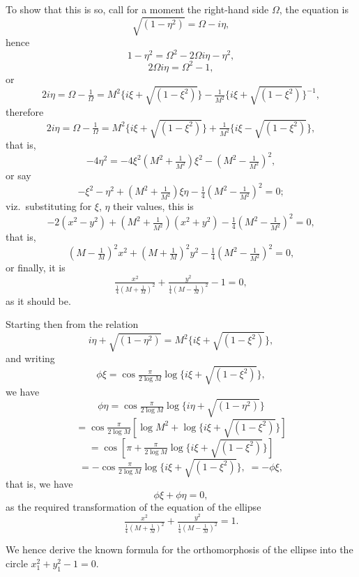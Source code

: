 \documentclass[11pt]{article}
\begin{document}
To show that this is so, call for a moment the right-hand side $\Omega$, the equation is
\[ \sqrt{(1 - \eta^{2})} = \Omega - i\eta, \]
hence
\[ 1 - \eta^{2} = \Omega^{2} - 2\Omega i\eta - \eta^{2}, \]
\[ 2\Omega i\eta = \Omega^{2} - 1, \]
or
\[ 2i\eta = \Omega - \tfrac{1}{\Omega} = M^{2}\{i\xi + \sqrt{(1 - \xi^{2})}\} - \tfrac{1}{M^{2}}\{i\xi + \sqrt{(1 - \xi^{2})}\}^{-1}, \]
therefore
\[ 2i\eta = \Omega - \tfrac{1}{\Omega} = M^{2}\{i\xi + \sqrt{(1 - \xi^{2})}\} + \tfrac{1}{M^{2}}\{i\xi - \sqrt{(1 - \xi^{2})}\}, \]
that is,
\[ -4\eta^{2} = -4\xi^{2}\!\left(M^{2} + \tfrac{1}{M^{2}}\right)\xi^{2} - \!\left(M^{2} - \tfrac{1}{M^{2}}\right)^{2}, \]
or say
\[ -\xi^{2} - \eta^{2} + \!\left(M^{2} + \tfrac{1}{M^{2}}\right)\xi\eta - \tfrac{1}{4}\!\left(M^{2} - \tfrac{1}{M^{2}}\right)^{2} = 0; \]
viz.\ substituting for $\xi$, $\eta$ their values, this is
\[ -2(x^{2} - y^{2}) + \!\left(M^{2} + \tfrac{1}{M^{2}}\right)(x^{2} + y^{2}) - \tfrac{1}{4}\!\left(M^{2} - \tfrac{1}{M^{2}}\right)^{2} = 0, \]
that is,
\[ \!\left(M - \tfrac{1}{M}\right)^{2}x^{2} + \!\left(M + \tfrac{1}{M}\right)^{2}y^{2} - \tfrac{1}{4}\!\left(M^{2} - \tfrac{1}{M^{2}}\right)^{2} = 0, \]
or finally, it is
\[ \tfrac{x^{2}}{\tfrac{1}{4}\!\left(M + \tfrac{1}{M}\right)^{2}} + \tfrac{y^{2}}{\tfrac{1}{4}\!\left(M - \tfrac{1}{M}\right)^{2}} - 1 = 0, \]
as it should be.

Starting then from the relation
\[ i\eta + \sqrt{(1 - \eta^{2})} = M^{2}\{i\xi + \sqrt{(1 - \xi^{2})}\}, \]
and writing
\[ \phi\xi = \cos\tfrac{\pi}{2\log M}\log\{i\xi + \sqrt{(1 - \xi^{2})}\}, \]
we have
\[ \phi\eta = \cos\tfrac{\pi}{2\log M}\log\{i\eta + \sqrt{(1 - \eta^{2})}\} \]
\[ = \cos\tfrac{\pi}{2\log M}\!\left[\log M^{2} + \log\{i\xi + \sqrt{(1 - \xi^{2})}\}\right] \]
\[ = \cos\!\left[\pi + \tfrac{\pi}{2\log M}\log\{i\xi + \sqrt{(1 - \xi^{2})}\}\right] \]
\[ = -\cos\tfrac{\pi}{2\log M}\log\{i\xi + \sqrt{(1 - \xi^{2})}\},\; = -\phi\xi, \]
that is, we have
\[ \phi\xi + \phi\eta = 0, \]
as the required transformation of the equation of the ellipse
\[ \tfrac{x^{2}}{\tfrac{1}{4}\!\left(M + \tfrac{1}{M}\right)^{2}} + \tfrac{y^{2}}{\tfrac{1}{4}\!\left(M - \tfrac{1}{M}\right)^{2}} = 1. \]

We hence derive the known formula for the orthomorphosis of the ellipse into the circle $x_{1}^{2} + y_{1}^{2} - 1 = 0$.
\end{document}
